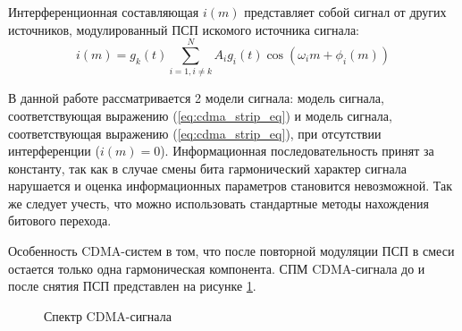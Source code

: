 Интерференционная составляющая ${i(m)}$ представляет собой сигнал от других источников, модулированный ПСП искомого источника сигнала:
\begin{equation}
	\label{eq:cdma_interference}
	i(m) = g_k(t) \sum\limits_{i=1, i \ne k}^{N}A_i g_i(t)\cos{(\omega_{i}m + \phi_i(m))}
\end{equation}

В данной работе рассматривается 2 модели сигнала: модель сигнала, соответствующая выражению (\ref{eq:cdma_strip_eq}) и модель сигнала,
соответствующая выражению (\ref{eq:cdma_strip_eq}), при отсутствии интерференции (${i(m)=0}$).
Информационная последовательность принят за константу, так как в случае смены бита гармонический характер сигнала нарушается и оценка информационных параметров становится невозможной.
Так же следует учесть, что можно использовать стандартные методы нахождения битового перехода.

Особенность CDMA-систем в том, что после повторной модуляции ПСП в смеси остается только одна гармоническая компонента.
СПМ CDMA-сигнала до и после снятия ПСП представлен на рисунке \ref{pic:gps_spectrum}.

\begin{figure}[H]
	\center{}
	\caption{Спектр CDMA-сигнала}
	\label{pic:gps_spectrum}
\end{figure}
